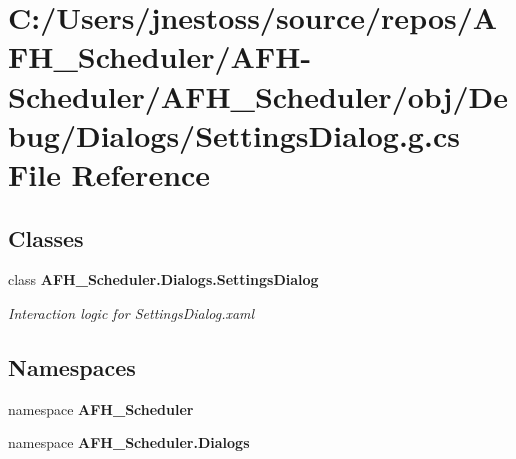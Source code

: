 \section{C\+:/\+Users/jnestoss/source/repos/\+A\+F\+H\+\_\+\+Scheduler/\+A\+F\+H-\/\+Scheduler/\+A\+F\+H\+\_\+\+Scheduler/obj/\+Debug/\+Dialogs/\+Settings\+Dialog.g.\+cs File Reference}
\label{_debug_2_dialogs_2_settings_dialog_8g_8cs}
\subsection*{Classes}
\begin{DoxyCompactItemize}
\item 
class \textbf{ A\+F\+H\+\_\+\+Scheduler.\+Dialogs.\+Settings\+Dialog}
\begin{DoxyCompactList}\small\item\em Interaction logic for Settings\+Dialog.\+xaml \end{DoxyCompactList}\end{DoxyCompactItemize}
\subsection*{Namespaces}
\begin{DoxyCompactItemize}
\item 
namespace \textbf{ A\+F\+H\+\_\+\+Scheduler}
\item 
namespace \textbf{ A\+F\+H\+\_\+\+Scheduler.\+Dialogs}
\end{DoxyCompactItemize}
